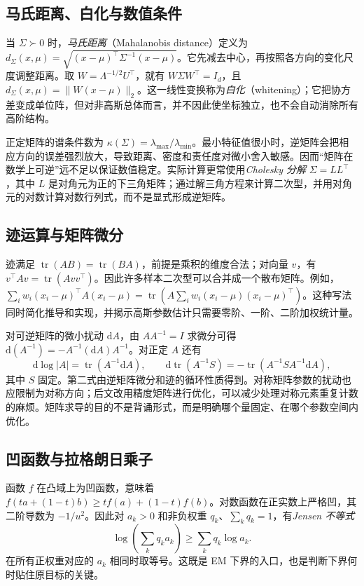 \documentclass[UTF8,12pt,a4paper,fontset=fandol]{ctexart}
\begin{document}
\subsection{马氏距离、白化与数值条件}
当 $\Sigma\succ0$ 时，\emph{马氏距离}（Mahalanobis distance）定义为 $d_\Sigma(x,\mu)=\sqrt{(x-\mu)^\top\Sigma^{-1}(x-\mu)}$。它先减去中心，再按照各方向的变化尺度调整距离。取 $W=\Lambda^{-1/2}U^\top$，就有 $W\Sigma W^\top=I_d$，且 $d_\Sigma(x,\mu)=\|W(x-\mu)\|_2$。这一线性变换称为\emph{白化}（whitening）；它把协方差变成单位阵，但对非高斯总体而言，并不因此使坐标独立，也不会自动消除所有高阶结构。

正定矩阵的谱条件数为 $\kappa(\Sigma)=\lambda_{\max}/\lambda_{\min}$。最小特征值很小时，逆矩阵会把相应方向的误差强烈放大，导致距离、密度和责任度对微小舍入敏感。因而“矩阵在数学上可逆”远不足以保证数值稳定。实际计算更常使用\emph{Cholesky 分解} $\Sigma=LL^\top$，其中 $L$ 是对角元为正的下三角矩阵；通过解三角方程来计算二次型，并用对角元的对数计算对数行列式，而不是显式形成逆矩阵。

\subsection{迹运算与矩阵微分}
迹满足 $\operatorname{tr}(AB)=\operatorname{tr}(BA)$，前提是乘积的维度合法；对向量 $v$，有 $v^\top Av=\operatorname{tr}(Avv^\top)$。因此许多样本二次型可以合并成一个散布矩阵。例如，$\sum_iw_i(x_i-\mu)^\top A(x_i-\mu)=\operatorname{tr}(A\sum_iw_i(x_i-\mu)(x_i-\mu)^\top)$。这种写法同时简化推导和实现，并揭示高斯参数估计只需要零阶、一阶、二阶加权统计量。

对可逆矩阵的微小扰动 $\mathrm dA$，由 $AA^{-1}=I$ 求微分可得 $\mathrm d(A^{-1})=-A^{-1}(\mathrm dA)A^{-1}$。对正定 $A$ 还有
\begin{equation}
\mathrm d\log|A|=\operatorname{tr}(A^{-1}\mathrm dA),\qquad
\mathrm d\operatorname{tr}(A^{-1}S)=-\operatorname{tr}(A^{-1}SA^{-1}\mathrm dA),
\label{eq:gmm-matrix-differential}
\end{equation}
其中 $S$ 固定。第二式由逆矩阵微分和迹的循环性质得到。对称矩阵参数的扰动也应限制为对称方向；后文改用精度矩阵进行优化，可以减少处理对称元素重复计数的麻烦。矩阵求导的目的不是背诵形式，而是明确哪个量固定、在哪个参数空间内优化。

\subsection{凹函数与拉格朗日乘子}
函数 $f$ 在凸域上为凹函数，意味着 $f(ta+(1-t)b)\geq tf(a)+(1-t)f(b)$。对数函数在正实数上严格凹，其二阶导数为 $-1/u^2$。因此对 $a_k>0$ 和非负权重 $q_k$、$\sum_kq_k=1$，有\emph{Jensen 不等式}
\begin{equation}
\log\!\left(\sum_kq_ka_k\right)\geq\sum_kq_k\log a_k.
\label{eq:gmm-jensen}
\end{equation}
在所有正权重对应的 $a_k$ 相同时取等号。这既是 EM 下界的入口，也是判断下界何时贴住原目标的关键。
\end{document}
